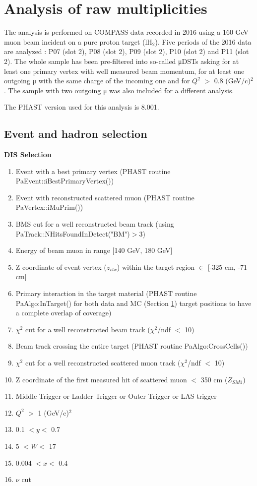 \documentclass[letterpaper,12pt]{article}
\begin{document}
\section{Analysis of raw multiplicities} \label{Raw}

The analysis is performed on COMPASS data recorded in 2016 using a 160 GeV muon beam incident on a pure proton target (lH$_2$).
Five periods of the 2016 data are analyzed : P07 (slot 2), P08 (slot 2), P09 (slot 2), P10 (slot 2) and P11 (slot 2).
The whole sample has been pre-filtered into so-called μDSTs asking for at least one primary vertex with well measured beam momentum, for at least one outgoing μ with the same charge of the incoming one and for $Q^2$ $>$ 0.8 (GeV/c)$^2$. The sample with two outgoing μ was also included for a different analysis\cite{JanPt}.

The PHAST version used for this analysis is 8.001.

\subsection{Event and hadron selection}

\hfill
\newline

\textbf{DIS Selection}
\begin{enumerate}
	\item Event with a best primary vertex (PHAST routine PaEvent::iBestPrimaryVertex())
	\item Event with reconstructed scattered muon (PHAST routine PaVertex::iMuPrim())
	\item BMS cut for a well reconstructed beam track (using PaTrack::NHitsFoundInDetect("BM")$>$3)
	\item Energy of beam muon in range [140 GeV, 180 GeV]
	\item Z coordinate of event vertex ($z_{vtx}$) within the target region $\in$ [-325 cm, -71 cm]
	\item Primary interaction in the target material (PHAST routine PaAlgo:InTarget() for both data and MC (Section \ref{Raw}) target positions
				to have a complete overlap of coverage)
	\item $\chi^2$ cut for a well reconstructed beam track ($\chi^2$/ndf $<$ 10)
	\item Beam track crossing the entire target (PHAST routine PaAlgo:CrossCells())
	\item $\chi^2$ cut for a well reconstructed scattered muon track ($\chi^2$/ndf $<$ 10)
	\item Z coordinate of the first measured hit of scattered muon $<$ 350 cm ($Z_{SM1}$)
	\item Middle Trigger or Ladder Trigger or Outer Trigger or LAS trigger
	\item $Q^2$ $>$ 1 (GeV/c)$^2$
	\item 0.1 $< y <$ 0.7
	\item 5 $< W <$ 17
	\item 0.004 $< x <$ 0.4
	\item $\nu$ cut
\end{enumerate}
\end{document}
